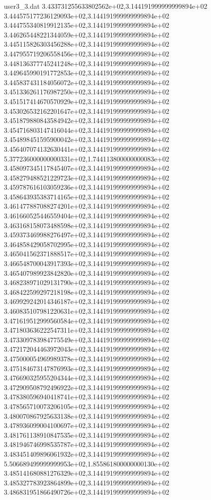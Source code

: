 \begin{filecontents}{user3_3.dat}
3.433731255633802562e+02,3.144191999999999894e+02
3.444575177236129093e+02,3.144191999999999894e+02
3.444755340819912135e+02,3.144191999999999894e+02
3.446265448221344059e+02,3.144191999999999894e+02
3.445115826303456288e+02,3.144191999999999894e+02
3.447955719206558456e+02,3.144191999999999894e+02
3.448136377745241248e+02,3.144191999999999894e+02
3.449645990191772853e+02,3.144191999999999894e+02
3.445837431184056072e+02,3.144191999999999894e+02
3.451336261176987250e+02,3.144191999999999894e+02
3.451517414670570929e+02,3.144191999999999894e+02
3.453026532162201647e+02,3.144191999999999894e+02
3.451879880843584942e+02,3.144191999999999894e+02
3.454716803147416044e+02,3.144191999999999894e+02
3.454898451595900042e+02,3.144191999999999894e+02
3.456407074132630441e+02,3.144191999999999894e+02
5.377236000000000331e+02,1.744113800000000083e+02
3.458097345117845407e+02,3.144191999999999894e+02
3.458279488521229723e+02,3.144191999999999894e+02
3.459787616103059236e+02,3.144191999999999894e+02
3.458643935383714165e+02,3.144191999999999894e+02
3.461477887088274201e+02,3.144191999999999894e+02
3.461660525446559404e+02,3.144191999999999894e+02
3.463168158073488598e+02,3.144191999999999894e+02
3.459373469988276497e+02,3.144191999999999894e+02
3.464858429058702995e+02,3.144191999999999894e+02
3.465041562371888517e+02,3.144191999999999894e+02
3.466548700043917393e+02,3.144191999999999894e+02
3.465407989923842820e+02,3.144191999999999894e+02
3.468238971029131790e+02,3.144191999999999894e+02
3.468422599297218198e+02,3.144191999999999894e+02
3.469929242014346187e+02,3.144191999999999894e+02
3.460835107981220631e+02,3.144191999999999894e+02
3.471619512999560584e+02,3.144191999999999894e+02
3.471803636222547311e+02,3.144191999999999894e+02
3.473309783984775549e+02,3.144191999999999894e+02
3.472172044463972043e+02,3.144191999999999894e+02
3.475000054969989378e+02,3.144191999999999894e+02
3.475184673147876993e+02,3.144191999999999894e+02
3.476690325955204344e+02,3.144191999999999894e+02
3.472909508792496922e+02,3.144191999999999894e+02
3.478380596940418741e+02,3.144191999999999894e+02
3.478565710073206105e+02,3.144191999999999894e+02
3.480070867925633138e+02,3.144191999999999894e+02
3.478936099004100697e+02,3.144191999999999894e+02
3.481761138910847535e+02,3.144191999999999894e+02
3.481946746998535787e+02,3.144191999999999894e+02
3.483451409896061932e+02,3.144191999999999894e+02
5.506689499999999953e+02,1.855861800000000130e+02
3.485141680881276329e+02,3.144191999999999894e+02
3.485327783923864899e+02,3.144191999999999894e+02
3.486831951866490726e+02,3.144191999999999894e+02

\end{filecontents}
